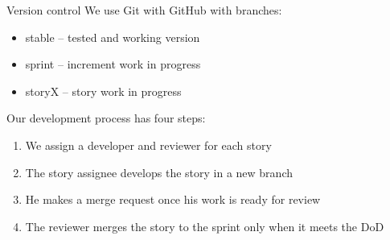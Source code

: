 \documentclass{beamer}
\begin{document}
\begin{frame}{Version control}
  We use Git with GitHub with branches:

  \begin{itemize}
  \item stable – tested and working version
  \item sprint – increment work in progress
  \item storyX – story work in progress
  \end{itemize}

  Our development process has four steps:

  \begin{enumerate}
  \item We assign a developer and reviewer for each story
  \item The story assignee develops the story in a new branch
  \item He makes a merge request once his work is ready for review
  \item The reviewer merges the story to the sprint only when it meets the DoD
  \end{enumerate}
\end{frame}
\end{document}
